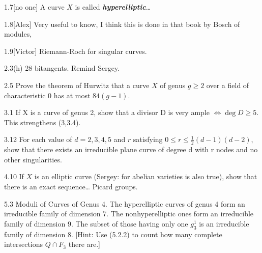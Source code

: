\begin{manualexercise}{1.7}[no one]
	A curve $X$ is called \textit{\textbf{hyperelliptic}}…
\end{manualexercise}

\begin{manualexercise}{1.8}[Alex]
	Very useful to know, I think this is done in that book by Bosch of modules,
\end{manualexercise}

\begin{manualexercise}{1.9}[Victor]
	Riemann-Roch for singular curves.
\end{manualexercise}

\begin{manualexercise}{2.3(h)}
	28 bitangents. Remind Sergey.
\end{manualexercise}

\begin{manualexercise}{2.5}
	Prove the theorem of Hurwitz that a curve $X$ of genus $g\geq 2$ over a field of characteristic 0 has at most $84(g-1)$.
\end{manualexercise}

\begin{manualexercise}{3.1}
	If X is a curve of genus 2, show that a divisor D is very ample $\iff \operatorname{deg} D \geq 5$.  This strengthens (3,3.4).
\end{manualexercise}

\begin{manualexercise}{3.12}
	For each value of $d = 2,3,4,5$ and $r$ satisfying $0\leq r\leq \frac{1}{2}(d-1)(d-2)$, show  that there exists an irreducible plane curve of degree d with r nodes and no other  singularities.
\end{manualexercise}

\begin{manualexercise}{4.10}
	If $X$ is an elliptic curve (Sergey: for abelian varieties is also true), show that there is an exact sequence… Picard groups.
\end{manualexercise}

\begin{manualexercise}{5.3}
	Moduli of Curves of Genus 4. The hyperelliptic curves of genus 4 form an irreducible family of dimension 7. The nonhyperelliptic ones form an irreducible  family of dimension 9. The subset of those having only one $g_3^{1}$ is an irreducible  family of dimension 8. [Hint: Use (5.2.2) to count how many complete intersections $Q\cap F_3$ there are.]  
\end{manualexercise}

